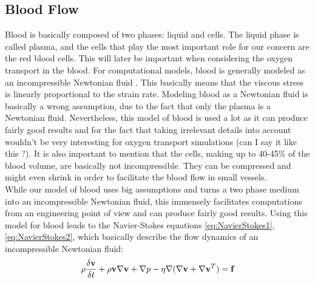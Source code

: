 \subsection{Blood Flow}
\label{Blood Flow}

Blood is basically composed of two phases: liquid and cells. The liquid phase is called plasma, and the cells that play the most important role for our concern are the red blood cells. This will later be important when considering the oxygen transport in the blood. For computational models, blood is generally modeled as an incompressible Newtonian fluid \cite{mathmodeling}. This basically means that the viscous stress is linearly proportional to the strain rate. Modeling blood as a Newtonian fluid is basically a wrong assumption, due to the fact that only the plasma is a Newtonian fluid. Nevertheless, this model of blood is used a lot as it can produce fairly good results and for the fact that taking irrelevant details into account wouldn't be very interesting for oxygen transport simulations {\color{red} (can I say it like this ?)}. It is also important to mention that the cells, making up to 40-45\% of the blood volume, are basically not incompressible. They can be compressed and might even shrink in order to facilitate the blood flow in small vessels.
\\While our model of blood uses big assumptions and turns a two phase medium into an incompressible Newtonian fluid, this immensely facilitates computations from an engineering point of view and can produce fairly good results.
Using this model for blood leads to the Navier-Stokes equations \ref{eq:NavierStokes1}, \ref{eq:NavierStokes2}, which basically describe the flow dynamics of an incompressible Newtonian fluid:
\begin{equation}
\\ \rho \frac{\delta \textbf{v}}{\delta t} + \rho \textbf{v} \nabla \textbf{v} + \nabla p - \eta \nabla ( \nabla \textbf{v} + \nabla \textbf{v}^T ) = \textbf{f}
\label{eq:NavierStokes1}
\end{equation}
